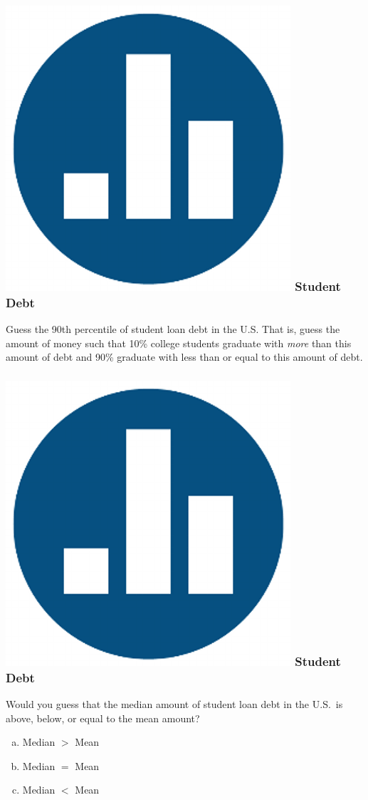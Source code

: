 
\begin{frame}
\frametitle{\includegraphics[scale = 0.05]{./images/clicker} \hfill  Student Debt}
Guess the \alert{90th percentile} of student loan debt in the U.S. That is, guess the amount of money such that 10\% college students graduate with \emph{more} than this amount of debt and 90\% graduate with less than or equal to this amount of debt.

\end{frame}
\begin{frame}
\frametitle{\includegraphics[scale = 0.05]{./images/clicker} \hfill  Student Debt}

Would you guess that the median amount of student loan debt in the U.S.\ is above, below,  or equal to the mean amount?
\begin{enumerate}[(a)]
	\item Median $>$ Mean
	\item Median $=$ Mean
	\item Median $<$ Mean
\end{enumerate}

\end{frame}
